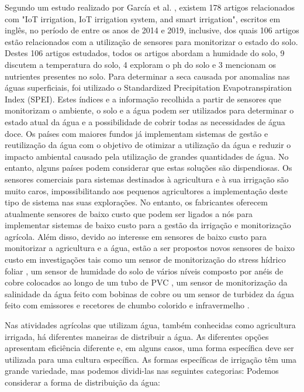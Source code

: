 \documentclass[conference]{IEEEtran}
\begin{document}
Segundo um estudo realizado por García et al. \cite{garcia2020iot}, existem 178 artigos
relacionados com  "IoT irrigation, IoT irrigation system, and smart
irrigation", escritos em inglês, no período de entre os
anos de 2014 e 2019, inclusive, dos quais 106 artigos estão relacionados com a
utilização de sensores para monitorizar o estado do solo. Destes 106 artigos
estudados, todos os artigos abordam a humidade do solo, 9 discutem a temperatura
do solo, 4 exploram o ph do solo e 3 mencionam os nutrientes presentes no solo.
Para determinar a seca causada por anomalias nas águas superficiais,
foi utilizado o Standardized Precipitation Evapotranspiration Index (SPEI).
Estes índices e a informação recolhida a partir de sensores que monitorizam o ambiente,
o solo e a água podem ser utilizados para determinar o estado atual da água e a
possibilidade de cobrir todas as necessidades de água doce. Os países com maiores
fundos já implementam sistemas de gestão e reutilização da água com o objetivo de
otimizar a utilização da água e reduzir o impacto ambiental causado pela utilização
de grandes quantidades de água. No entanto, alguns países podem considerar que estas
soluções são dispendiosas.
Os sensores comerciais para sistemas destinados à agricultura e à sua irrigação
são muito caros, impossibilitando aos pequenos agricultores a implementação deste
tipo de sistema nas suas explorações. No entanto, os fabricantes oferecem atualmente
sensores de baixo custo que podem ser ligados a nós para implementar sistemas de baixo
custo para a gestão da irrigação e monitorização agrícola. Além disso, devido ao interesse
em sensores de baixo custo para monitorizar a agricultura e a água, estão a ser propostos
novos sensores de baixo custo em investigações tais como um sensor de monitorização do
stress hídrico foliar \cite{daskalakis2018}, um sensor de humidade do solo de vários níveis composto
por anéis de cobre colocados ao longo de um tubo de PVC \cite{guruprasadh2017intelligent},
um sensor de monitorização da salinidade da água feito com bobinas de
cobre \cite{parra2013low} ou um sensor de turbidez da água
feito com emissores e recetores de chumbo colorido e infravermelho \cite{sendra2013low}.

Nas atividades agrícolas que utilizam água, também conhecidas
como agricultura irrigada, há diferentes maneiras de distribuir a água.
As diferentes opções apresentam eficiência diferente e, em alguns casos,
uma forma específica deve ser utilizada para uma cultura específica.
As formas específicas de irrigação têm uma grande variedade, mas podemos
dividi-las nas seguintes categorias: Podemos considerar a forma de
distribuição da água:
\end{document}
